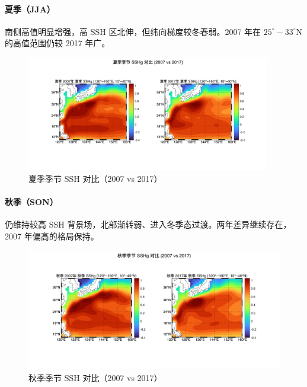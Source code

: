 \documentclass[UTF8]{article}
\begin{document}
\paragraph{夏季（JJA）}南侧高值明显增强，高 SSH 区北伸，但纬向梯度较冬春弱。2007 年在 $25^\circ\!-\!33^\circ\mathrm{N}$ 的高值范围仍较 2017 年广。
\begin{figure}[H]
    \centering
    \includegraphics[width=0.95\textwidth]{SSHg_JJA_2007vs2017.png}
    \caption{夏季季节 SSH 对比（2007 vs 2017）}
    \label{fig:sshg_jja}
\end{figure}


\paragraph{秋季（SON）}仍维持较高 SSH 背景场，北部渐转弱、进入冬季态过渡。两年差异继续存在，2007 年偏高的格局保持。
\begin{figure}[H]
    \centering
    \includegraphics[width=1\textwidth]{SSHg_SON_2007vs2017.png}
    \caption{秋季季节 SSH 对比（2007 vs 2017）}
    \label{fig:sshg_son}
\end{figure}
\end{document}

